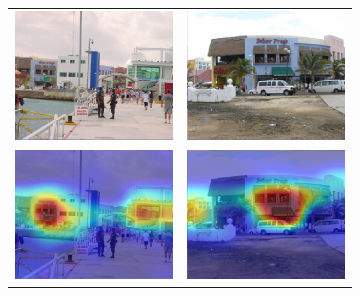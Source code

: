 \begin{figure}[t]
    \centering
    \begin{subfigure}[b]{.48\columnwidth}
        \centering
        \begin{tabular}{cc}
            \includegraphics[width=.45\columnwidth]{figures/chapter7/clarification/landmarks/1_im.png} &  
            \includegraphics[width=.45\columnwidth]{figures/chapter7/clarification/landmarks/2_im.png}\\
            \includegraphics[width=.45\columnwidth]{figures/chapter7/clarification/landmarks/1_hm.png} &  
            \includegraphics[width=.45\columnwidth]{figures/chapter7/clarification/landmarks/2_hm.png}\\

\end{tabular}
\end{subfigure}
\end{figure}
